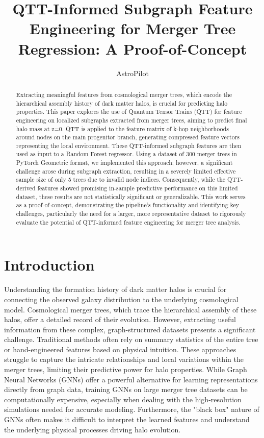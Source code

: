 \documentclass[twocolumn]{aastex631}
\begin{document}
\title{QTT-Informed Subgraph Feature Engineering for Merger Tree Regression: A Proof-of-Concept}

\author{AstroPilot}

\begin{abstract}
Extracting meaningful features from cosmological merger trees, which encode the hierarchical assembly history of dark matter halos, is crucial for predicting halo properties. This paper explores the use of Quantum Tensor Trains (QTT) for feature engineering on localized subgraphs extracted from merger trees, aiming to predict final halo mass at z=0. QTT is applied to the feature matrix of k-hop neighborhoods around nodes on the main progenitor branch, generating compressed feature vectors representing the local environment. These QTT-informed subgraph features are then used as input to a Random Forest regressor. Using a dataset of 300 merger trees in PyTorch Geometric format, we implemented this approach; however, a significant challenge arose during subgraph extraction, resulting in a severely limited effective sample size of only 5 trees due to invalid node indices. Consequently, while the QTT-derived features showed promising in-sample predictive performance on this limited dataset, these results are not statistically significant or generalizable. This work serves as a proof-of-concept, demonstrating the pipeline's functionality and identifying key challenges, particularly the need for a larger, more representative dataset to rigorously evaluate the potential of QTT-informed feature engineering for merger tree analysis.
\end{abstract}



\section{Introduction}
\label{sec:intro}

Understanding the formation history of dark matter halos is crucial for connecting the observed galaxy distribution to the underlying cosmological model. Cosmological merger trees, which trace the hierarchical assembly of these halos, offer a detailed record of their evolution. However, extracting useful information from these complex, graph-structured datasets presents a significant challenge. Traditional methods often rely on summary statistics of the entire tree or hand-engineered features based on physical intuition. These approaches struggle to capture the intricate relationships and local variations within the merger trees, limiting their predictive power for halo properties. While Graph Neural Networks (GNNs) offer a powerful alternative for learning representations directly from graph data, training GNNs on large merger tree datasets can be computationally expensive, especially when dealing with the high-resolution simulations needed for accurate modeling. Furthermore, the "black box" nature of GNNs often makes it difficult to interpret the learned features and understand the underlying physical processes driving halo evolution.
\end{document}
